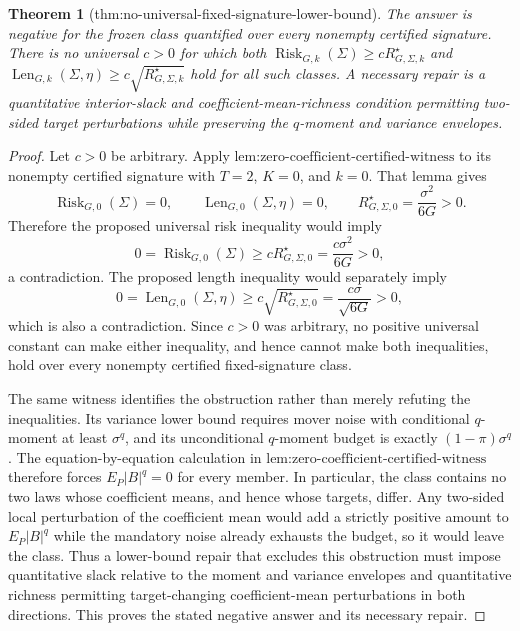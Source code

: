 \documentclass{article}
\newtheorem{theorem}{Theorem}
\begin{document}
\begin{theorem}[thm:no-universal-fixed-signature-lower-bound]\label{thm:no-universal-fixed-signature-lower-bound}
The answer is negative for the frozen class quantified over every nonempty certified signature. There is no universal \(c>0\) for which both \(\operatorname{Risk}_{G,k}(\Sigma)\ge cR_{G,\Sigma,k}^{\star}\) and \(\operatorname{Len}_{G,k}(\Sigma,\eta)\ge c\sqrt{R_{G,\Sigma,k}^{\star}}\) hold for all such classes. A necessary repair is a quantitative interior-slack and coefficient-mean-richness condition permitting two-sided target perturbations while preserving the \(q\)-moment and variance envelopes.
\end{theorem}
\begin{proof}
Let \(c>0\) be arbitrary. Apply \(\text{lem:zero-coefficient-certified-witness}\) to its nonempty certified signature with \(T=2\), \(K=0\), and \(k=0\). That lemma gives
\[
 \operatorname{Risk}_{G,0}(\Sigma)=0,
 \qquad
 \operatorname{Len}_{G,0}(\Sigma,\eta)=0,
 \qquad
 R_{G,\Sigma,0}^{\star}=\frac{\sigma^2}{6G}>0.
\]
Therefore the proposed universal risk inequality would imply
\[
 0=\operatorname{Risk}_{G,0}(\Sigma)
 \ge cR_{G,\Sigma,0}^{\star}
 =\frac{c\sigma^2}{6G}>0,
\]
a contradiction. The proposed length inequality would separately imply
\[
 0=\operatorname{Len}_{G,0}(\Sigma,\eta)
 \ge c\sqrt{R_{G,\Sigma,0}^{\star}}
 =\frac{c\sigma}{\sqrt{6G}}>0,
\]
which is also a contradiction. Since \(c>0\) was arbitrary, no positive universal constant can make either inequality, and hence cannot make both inequalities, hold over every nonempty certified fixed-signature class.

The same witness identifies the obstruction rather than merely refuting the inequalities. Its variance lower bound requires mover noise with conditional \(q\)-moment at least \(\sigma^q\), and its unconditional \(q\)-moment budget is exactly \((1-\pi)\sigma^q\). The equation-by-equation calculation in \(\text{lem:zero-coefficient-certified-witness}\) therefore forces \(E_P|B|^q=0\) for every member. In particular, the class contains no two laws whose coefficient means, and hence whose targets, differ. Any two-sided local perturbation of the coefficient mean would add a strictly positive amount to \(E_P|B|^q\) while the mandatory noise already exhausts the budget, so it would leave the class. Thus a lower-bound repair that excludes this obstruction must impose quantitative slack relative to the moment and variance envelopes and quantitative richness permitting target-changing coefficient-mean perturbations in both directions. This proves the stated negative answer and its necessary repair.
\end{proof}
\end{document}
